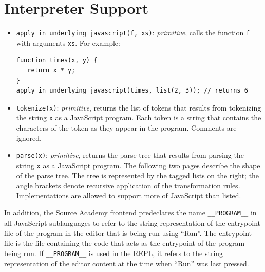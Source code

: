 \section*{Interpreter Support}

\begin{itemize}
\item \lstinline{apply_in_underlying_javascript(f, xs)}: \textit{primitive}, calls the function \lstinline{f}
with arguments \lstinline{xs}. For example:
\begin{lstlisting}
function times(x, y) {
   return x * y;
}
apply_in_underlying_javascript(times, list(2, 3)); // returns 6
\end{lstlisting}
\item \lstinline{tokenize(x)}: \textit{primitive}, returns the list of tokens that results from tokenizing
  the string \lstinline{x} as a JavaScript program. Each token is a string that contains the characters of
  the token as they appear in the program. Comments are ignored.
\item \lstinline{parse(x)}: \textit{primitive}, returns the parse tree that results from parsing
  the string \lstinline{x} as a JavaScript program. The following two pages describe the shape of the parse tree.
  The tree is represented by the tagged lists on the right; the angle brackets denote recursive application
  of the transformation rules. Implementations are allowed to support more of JavaScript than listed.
\end{itemize}
In addition, the Source Academy frontend predeclares the name \lstinline{__PROGRAM__} in all JavaScript sublanguages to
refer to the string representation of the entrypoint file of the program in the editor that is being run using ``Run''.
The entrypoint file is the file containing the code that acts as the entrypoint of the program being run.
If \lstinline{__PROGRAM__} is used in the REPL, it refers to the string representation of the editor content
at the time when ``Run'' was last pressed.

\newpage
{}
\recalctypearea
	\addtolength{\oddsidemargin}{-5cm}
	\addtolength{\evensidemargin}{-5cm}
	\addtolength{\textwidth}{13cm}

